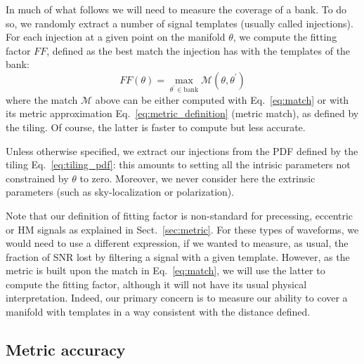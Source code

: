 \documentclass[twocolumn,showpacs,preprintnumbers,nofootinbib,prd,
superscriptaddress,10pt]{revtex4-2}
\newcommand{\stefano}[1]{{\textcolor{blue}{\texttt{SS: #1}} }}
\begin{document}
In much of what follows we will need to measure the coverage of a bank. To do so, we randomly extract a number of signal templates (usually called injections).
For each injection at a given point on the manifold $\theta$, we compute the fitting factor $FF$, defined as the best match the injection has with the templates of the bank:
\begin{equation}\label{eq:FF}
	FF(\theta) = \max_{\theta^\prime \in \text{bank}} \mathcal{M}(\theta, \theta^\prime)
\end{equation}
where the match $\mathcal{M}$ above can be either computed with Eq.~\eqref{eq:match} or with its metric approximation Eq.~\eqref{eq:metric_definition} (metric match), as defined by the tiling.
Of course, the latter is faster to compute but less accurate.

Unless otherwise specified, we extract our injections from the PDF defined by the tiling Eq.~\eqref{eq:tiling_pdf}: this amounts to setting all the intrisic parameters not constrained by $\theta$ to zero.
Moreover, we never consider here the extrinsic parameters (such as sky-localization or polarization).

Note that our definition of fitting factor is non-standard for precessing, eccentric or HM signals as explained in Sect.~\ref{sec:metric}. For these types of waveforms, we would need to use a different expression, if we wanted to measure, as usual, the fraction of SNR lost by filtering a signal with a given template. However, as the metric is built upon the match in Eq.~\eqref{eq:match}, we will use the latter to compute the fitting factor, although it will not have its usual physical interpretation. Indeed, our primary concern is to measure our ability to cover a manifold with templates in a way consistent with the distance defined.

\subsection{Metric accuracy} \label{sec:metric_accuracy}
\end{document}
